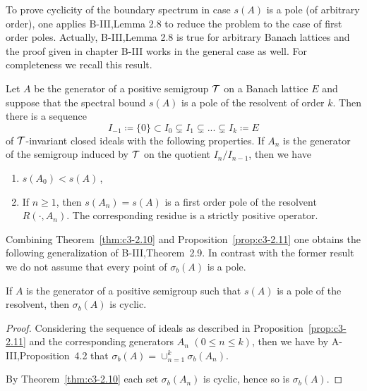 To prove cyclicity of the boundary spectrum in case $s(A)$ is a pole (of arbitrary order), one applies B-III,Lemma 2.8 to reduce the problem to the case of first order poles. Actually, B-III,Lemma 2.8 is true for arbitrary Banach lattices and the proof given in chapter B-III works in the general case as well. For completeness we recall this result. 

\begin{proposition}\label{prop:c3-2.11}
	Let $A$ be the generator of a positive semigroup $\mathcal{T}$ on a Banach lattice $E$ and suppose that the spectral bound $s(A)$ is a pole of the resolvent of order $k$.
	Then there is a sequence
	\begin{equation}\label{eq:c3-2.22}
		I_{-1} \coloneqq \{0\} \subset I_{0} \subsetneq I_{1} \subsetneq ... \subsetneq I_{k} \coloneqq E
	\end{equation}
	of $\mathcal{T}$-invariant closed ideals with the following properties.
	If $A_{n}$ is the generator of the semigroup induced by $\mathcal{T}$ on the quotient $I_{n}/I_{n-1}$, then we have
	\begin{enumerate}[\upshape (i)]
		\item 	
		$s(A_{0}) < s(A)$\,,

		\item 
		If $n \geq 1$, then $s(A_{n}) = s(A)$ is a first order pole of the resolvent $R(\cdot,A_{n})$.
		The corresponding residue is a strictly positive operator.

	\end{enumerate}
\end{proposition}
%
%
Combining Theorem~\ref{thm:c3-2.10} and Proposition~\ref{prop:c3-2.11} one obtains the following generalization of B-III,Theorem~2.9.
In contrast with the former result we do not assume that every point of $\sigma_{b}(A)$ is a pole.
\begin{corollary}\label{cor:c3-2.12}
	If $A$ is the generator of a positive semigroup such that $s(A)$ is a pole of the resolvent, then $\sigma_{b}(A)$ is cyclic.
\end{corollary}

\begin{proof}
Considering the sequence of ideals as described in Proposition~\ref{prop:c3-2.11} and the corresponding generators $A_{n}$ $(0 \leq n \leq k)$, then we have by A-III,Proposition~4.2 that $\sigma_{b}(A) = \cup_{n=1}^{k} \sigma_{b}(A_{n})$.

By Theorem~\ref{thm:c3-2.10} each set $\sigma_{b}(A_{n})$ is cyclic, hence so is $\sigma_{b}(A)$.
\end{proof}

